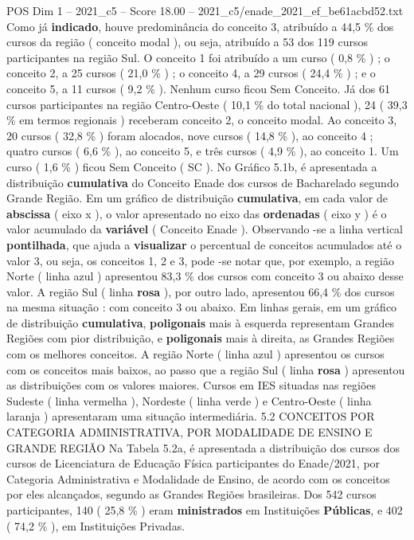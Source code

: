 \begin{textsample}{POS Dim 1 – 2021\_c5 – Score 18.00 – 2021\_c5/enade\_2021\_ef\_be61acbd52.txt}
Como já \textbf{indicado}, houve predominância do conceito 3, atribuído a 44,5 \% dos cursos da região ( conceito modal ), ou seja, atribuído a 53 dos 119 cursos participantes na região Sul.
O conceito 1 foi atribuído a um curso ( 0,8 \% ) ; o conceito 2, a 25 cursos ( 21,0 \% ) ; o conceito 4, a 29 cursos ( 24,4 \% ) ; e o conceito 5, a 11 cursos ( 9,2 \% ).
Nenhum curso ficou Sem Conceito.
Já dos 61 cursos participantes na região Centro-Oeste ( 10,1 \% do total nacional ), 24 ( 39,3 \% em termos regionais ) receberam conceito 2, o conceito modal.
Ao conceito 3, 20 cursos ( 32,8 \% ) foram alocados, nove cursos ( 14,8 \% ), ao conceito 4 ; quatro cursos ( 6,6 \% ), ao conceito 5, e três cursos ( 4,9 \% ), ao conceito 1.
Um curso ( 1,6 \% ) ficou Sem Conceito ( SC ).
No Gráfico 5.1b, é apresentada a distribuição \textbf{cumulativa} do Conceito Enade dos cursos de Bacharelado segundo Grande Região.
Em um gráfico de distribuição \textbf{cumulativa}, em cada valor de \textbf{abscissa} ( eixo x ), o valor apresentado no eixo das \textbf{ordenadas} ( eixo y ) é o valor acumulado da \textbf{variável} ( Conceito Enade ).
Observando -se a linha vertical \textbf{pontilhada}, que ajuda a \textbf{visualizar} o percentual de conceitos acumulados até o valor 3, ou seja, os conceitos 1, 2 e 3, pode -se notar que, por exemplo, a região Norte ( linha azul ) apresentou 83,3 \% dos cursos com conceito 3 ou abaixo desse valor.
A região Sul ( linha \textbf{rosa} ), por outro lado, apresentou 66,4 \% dos cursos na mesma situação : com conceito 3 ou abaixo.
Em linhas gerais, em um gráfico de distribuição \textbf{cumulativa}, \textbf{poligonais} mais à esquerda representam Grandes Regiões com pior distribuição, e \textbf{poligonais} mais à direita, as Grandes Regiões com os melhores conceitos.
A região Norte ( linha azul ) apresentou os cursos com os conceitos mais baixos, ao passo que a região Sul ( linha \textbf{rosa} ) apresentou as distribuições com os valores maiores.
Cursos em IES situadas nas regiões Sudeste ( linha vermelha ), Nordeste ( linha verde ) e Centro-Oeste ( linha laranja ) apresentaram uma situação intermediária. 5.2 CONCEITOS POR CATEGORIA ADMINISTRATIVA, POR MODALIDADE DE ENSINO E GRANDE REGIÃO Na Tabela 5.2a, é apresentada a distribuição dos cursos dos cursos de Licenciatura de Educação Física participantes do Enade/2021, por Categoria Administrativa e Modalidade de Ensino, de acordo com os conceitos por eles alcançados, segundo as Grandes Regiões brasileiras.
Dos 542 cursos participantes, 140 ( 25,8 \% ) eram \textbf{ministrados} em Instituições \textbf{Públicas}, e 402 ( 74,2 \% ), em Instituições Privadas.

\end{textsample}
